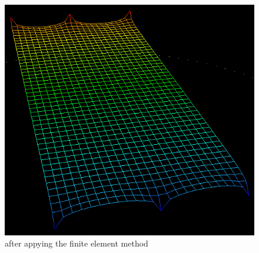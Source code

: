 \documentclass[a4paper,12pt]{article}
\begin{document}
\begin{figure}[H]
\begin{center}
  \includegraphics[width=\textwidth]{six_points_smooth}
\end{center}
\caption{after appying the finite element method}
\end{figure}


\end{document}
